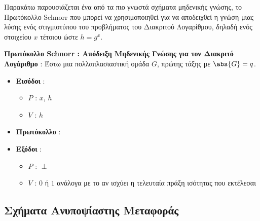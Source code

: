 Παρακάτω παρουσιάζεται ένα από τα πιο γνωστά σχήματα μηδενικής γνώσης, το Πρωτόκολλο Schnorr που μπορεί να χρησιμοποιηθεί για να αποδειχθεί η γνώση μιας λύσης ενός στιγμιοτύπου του προβλήματος του Διακριτού Λογαρίθμου, δηλαδή ενός στοιχείου $x$ τέτοιου ώστε $h=g^x$.

\begin{definition}
    \textbf{Πρωτόκολλο Schnorr : Απόδειξη Μηδενικής Γνώσης για τον Διακριτό Λογάριθμο} \cite{cramer1994proofs} :
    Έστω μια πολλαπλασιαστική ομάδα $G$, πρώτης τάξης με $\abs{G}=q$.
    \begin{itemize}
        \item \textbf{Εισόδοι} :
            \begin{itemize}
                \item $P$ : $x$, $h$
                \item $V$ : $h$
            \end{itemize}
        \item \textbf{Πρωτόκολλο} : 
        \item \textbf{Εξόδοι} :
            \begin{itemize}
                \item $P$ : $\perp$
                \item $V$ : $0$ ή $1$ ανάλογα με το αν ισχύει η τελευταία πράξη ισότητας που εκτέλεσαι
            \end{itemize}
    \end{itemize}
\end{definition}

\subsection{Σχήματα Ανυποψίαστης Μεταφοράς}

